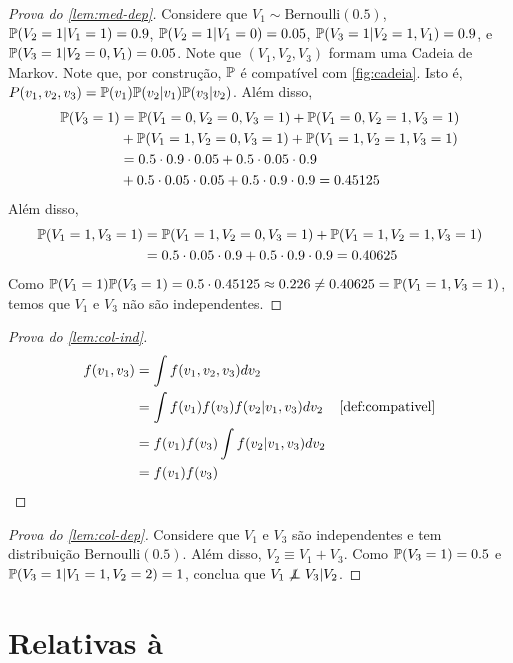 \begin{proof}[Prova do \cref{lem:med-dep}]
 Considere que $V_1 \sim \text{Bernoulli}(0.5)$,
 $\P(V_2=1|V_1=1)=0.9$, $\P(V_2=1|V_1=0)=0.05$,
 $\P(V_3=1|V_2=1,V_1)=0.9$, e $\P(V_3=1|V_2=0,V_1)=0.05$.
 Note que $(V_1,V_2,V_3)$ formam uma Cadeia de Markov.
 Note que, por construção, $\P$ é 
 compatível com \cref{fig:cadeia}.
 Isto é, $P(v_1,v_2,v_3) = \P(v_1)\P(v_2|v_1)\P(v_3|v_2)$.
 Além disso,
 \begin{align*}
  \P(V_3 = 1) &= \P(V_1=0, V_2=0, V_3=1) + \P(V_1=0, V_2=1, V_3=1) \\
              &+ \P(V_1=1, V_2=0, V_3=1) + \P(V_1=1, V_2=1, V_3=1) \\
              &= 0.5 \cdot 0.9 \cdot 0.05 + 0.5 \cdot 0.05 \cdot 0.9 \\
              &+ 0.5 \cdot 0.05 \cdot 0.05 + 0.5 \cdot 0.9 \cdot 0.9 
              = 0.45125
 \end{align*}
 Além disso,
 \begin{align*}
  \P(V_1 = 1, V_3 = 1)
  &= \P(V_1 = 1, V_2 = 0, V_3 = 1) 
  +  \P(V_1 = 1, V_2 = 1, V_3 = 1) \\
  &= 0.5 \cdot 0.05 \cdot 0.9 + 0.5 \cdot 0.9 \cdot 0.9
  = 0.40625
 \end{align*}
 Como $\P(V_1=1)\P(V_3=1) = 0.5 \cdot 0.45125 \approx 0.226 \neq 
 0.40625 = \P(V_1=1,V_3=1)$,
 temos que $V_1$ e $V_3$ não são independentes.
\end{proof}

\begin{proof}[Prova do \cref{lem:col-ind}]
 \begin{align*}
  f(v_1,v_3) 
  &= \int f(v_1, v_2, v_3) dv_2 \\
  &= \int f(v_1)f(v_3)f(v_2|v_1,v_3) dv_2 
  & \text{\cref{def:compativel}} \\
  &= f(v_1)f(v_3) \int f(v_2|v_1,v_3) dv_2 \\
  &= f(v_1)f(v_3)
 \end{align*}
\end{proof}

\begin{proof}[Prova do \cref{lem:col-dep}]
 Considere que $V_1$ e $V_3$ são
 independentes e tem distribuição $\text{Bernoulli}(0.5)$.
 Além disso, $V_2 \equiv V_1+V_3$.
 Como $\P(V_3 = 1) = 0.5$ e
 $\P(V_3=1|V_1=1,V_2=2) = 1$, conclua que
 $V_1 \not\ind V_3 | V_2$.
\end{proof}

\section{Relativas à }

